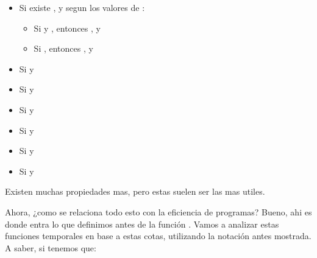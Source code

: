 \documentclass{article}
\begin{document}
\begin{itemize}
	\item Si existe , y segun los valores de :
	\begin{itemize}
		\item[] Si  y , entonces ,  y 
		\item[] Si , entonces ,  y 
	\end{itemize}
	
	\item Si  y  \formula{\Longrightarrow} 
	
	\item Si  y  \formula{\Longrightarrow} 
	
	\item Si  y  \formula{\Longrightarrow} 
	
	\item Si  y  \formula{\Longrightarrow} 
	
	\item Si  y  \formula{\Longrightarrow} 
	
	\item Si  y  \formula{\Longrightarrow} 
\end{itemize}

Existen muchas propiedades mas, pero estas suelen ser las mas utiles.

Ahora, ¿como se relaciona todo esto con la eficiencia de programas? Bueno, ahi es donde entra lo que definimos antes de la función . Vamos a analizar estas funciones temporales en base a estas cotas, utilizando la notación antes mostrada. A saber, si tenemos que:

\end{document}
